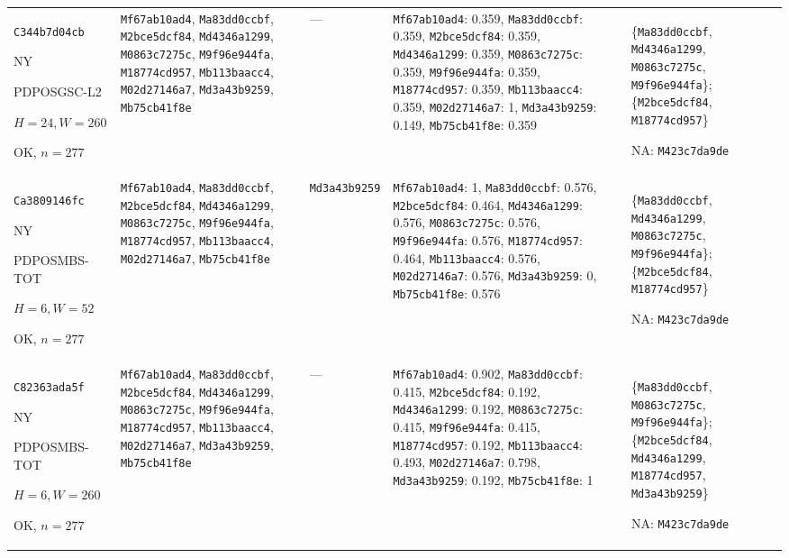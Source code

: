 \begin{longtable}{p{.15\linewidth}p{.17\linewidth}p{.17\linewidth}p{.25\linewidth}p{.14\linewidth}}
\texttt{C344b7d04cb}\par NY\par PDPOSGSC-\allowbreak{}L2\par $H=24,W=260$\par OK, $n=277$ & \texttt{Mf67ab10ad4}, \texttt{Ma83dd0ccbf}, \texttt{M2bce5dcf84}, \texttt{Md4346a1299}, \texttt{M0863c7275c}, \texttt{M9f96e944fa}, \texttt{M18774cd957}, \texttt{Mb113baacc4}, \texttt{M02d27146a7}, \texttt{Md3a43b9259}, \texttt{Mb75cb41f8e} & --- & \texttt{Mf67ab10ad4}: 0.359, \texttt{Ma83dd0ccbf}: 0.359, \texttt{M2bce5dcf84}: 0.359, \texttt{Md4346a1299}: 0.359, \texttt{M0863c7275c}: 0.359, \texttt{M9f96e944fa}: 0.359, \texttt{M18774cd957}: 0.359, \texttt{Mb113baacc4}: 0.359, \texttt{M02d27146a7}: 1, \texttt{Md3a43b9259}: 0.149, \texttt{Mb75cb41f8e}: 0.359 & \{\texttt{Ma83dd0ccbf}, \texttt{Md4346a1299}, \texttt{M0863c7275c}, \texttt{M9f96e944fa}\}; \{\texttt{M2bce5dcf84}, \texttt{M18774cd957}\}\par NA: \texttt{M423c7da9de} \\
\texttt{Ca3809146fc}\par NY\par PDPOSMBS-\allowbreak{}TOT\par $H=6,W=52$\par OK, $n=277$ & \texttt{Mf67ab10ad4}, \texttt{Ma83dd0ccbf}, \texttt{M2bce5dcf84}, \texttt{Md4346a1299}, \texttt{M0863c7275c}, \texttt{M9f96e944fa}, \texttt{M18774cd957}, \texttt{Mb113baacc4}, \texttt{M02d27146a7}, \texttt{Mb75cb41f8e} & \texttt{Md3a43b9259} & \texttt{Mf67ab10ad4}: 1, \texttt{Ma83dd0ccbf}: 0.576, \texttt{M2bce5dcf84}: 0.464, \texttt{Md4346a1299}: 0.576, \texttt{M0863c7275c}: 0.576, \texttt{M9f96e944fa}: 0.576, \texttt{M18774cd957}: 0.464, \texttt{Mb113baacc4}: 0.576, \texttt{M02d27146a7}: 0.576, \texttt{Md3a43b9259}: 0, \texttt{Mb75cb41f8e}: 0.576 & \{\texttt{Ma83dd0ccbf}, \texttt{Md4346a1299}, \texttt{M0863c7275c}, \texttt{M9f96e944fa}\}; \{\texttt{M2bce5dcf84}, \texttt{M18774cd957}\}\par NA: \texttt{M423c7da9de} \\
\texttt{C82363ada5f}\par NY\par PDPOSMBS-\allowbreak{}TOT\par $H=6,W=260$\par OK, $n=277$ & \texttt{Mf67ab10ad4}, \texttt{Ma83dd0ccbf}, \texttt{M2bce5dcf84}, \texttt{Md4346a1299}, \texttt{M0863c7275c}, \texttt{M9f96e944fa}, \texttt{M18774cd957}, \texttt{Mb113baacc4}, \texttt{M02d27146a7}, \texttt{Md3a43b9259}, \texttt{Mb75cb41f8e} & --- & \texttt{Mf67ab10ad4}: 0.902, \texttt{Ma83dd0ccbf}: 0.415, \texttt{M2bce5dcf84}: 0.192, \texttt{Md4346a1299}: 0.192, \texttt{M0863c7275c}: 0.415, \texttt{M9f96e944fa}: 0.415, \texttt{M18774cd957}: 0.192, \texttt{Mb113baacc4}: 0.493, \texttt{M02d27146a7}: 0.798, \texttt{Md3a43b9259}: 0.192, \texttt{Mb75cb41f8e}: 1 & \{\texttt{Ma83dd0ccbf}, \texttt{M0863c7275c}, \texttt{M9f96e944fa}\}; \{\texttt{M2bce5dcf84}, \texttt{Md4346a1299}, \texttt{M18774cd957}, \texttt{Md3a43b9259}\}\par NA: \texttt{M423c7da9de} \\

\end{longtable}

